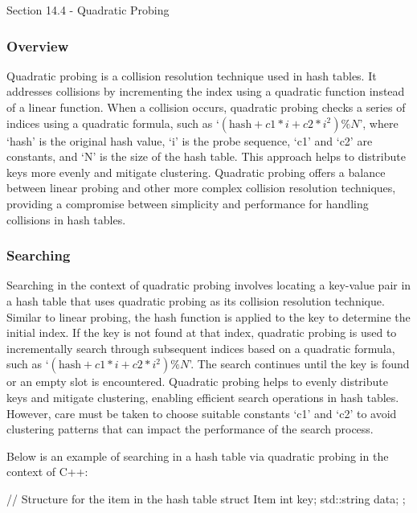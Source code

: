 \begin{notes}{Section 14.4 - Quadratic Probing}
    \subsubsection*{Overview}

    Quadratic probing is a collision resolution technique used in hash tables. It addresses collisions by incrementing the index using a quadratic function instead of a linear function. When a collision 
    occurs, quadratic probing checks a series of indices using a quadratic formula, such as `$(\text{hash} + c1 * i + c2 * i^2) \% N$', where `hash' is the original hash value, `i' is the probe sequence, 
    `c1' and `c2' are constants, and `N' is the size of the hash table. This approach helps to distribute keys more evenly and mitigate clustering. Quadratic probing offers a balance between linear probing 
    and other more complex collision resolution techniques, providing a compromise between simplicity and performance for handling collisions in hash tables.
    
    \subsubsection*{Searching}
    
    Searching in the context of quadratic probing involves locating a key-value pair in a hash table that uses quadratic probing as its collision resolution technique. Similar to linear probing, the hash 
    function is applied to the key to determine the initial index. If the key is not found at that index, quadratic probing is used to incrementally search through subsequent indices based on a quadratic 
    formula, such as `$(\text{hash} + c1 * i + c2 * i^2) \% N$'. The search continues until the key is found or an empty slot is encountered. Quadratic probing helps to evenly distribute keys and mitigate 
    clustering, enabling efficient search operations in hash tables. However, care must be taken to choose suitable constants `c1' and `c2' to avoid clustering patterns that can impact the performance of 
    the search process.
    
    \begin{highlight}
        Below is an example of searching in a hash table via quadratic probing in the context of C++:
    
    \begin{code}[C++]
    // Structure for the item in the hash table
    struct Item {
        int key;
        std::string data;
    };
    

\end{code}
\end{highlight}
\end{notes}
